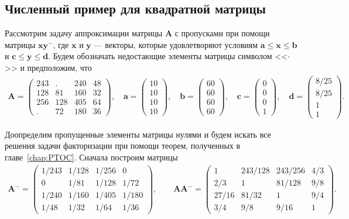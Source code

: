 \documentclass[specialist,
               substylefile = spbu.rtx,
               subf,href,colorlinks=true, 12pt]{disser}
\theoremstyle{definition}
\begin{document}
\subsection{Численный пример для квадратной матрицы}\label{sec:example}
Рассмотрим задачу аппроксимации матрицы $\bm{A}$ с пропусками при помощи матрицы $\bm{x}\bm{y}^{-}$, где  $\bm{x}$ и $\bm{y}$ --- векторы, которые удовлетворяют условиям $\bm{a}\leq \bm{x}\leq \bm{b}$ и $\bm{c}\leq \bm{y}\leq \bm{d}$. Будем обозначать недостающие элементы матрицы символом <<$\cdot$>> и предположим, что
\begin{equation*}
\begin{gathered}
\bm{A}
=
\begin{pmatrix}
243 &. &240 &48\\
128 &81 &160 &32\\
256 &128 &405 &64\\
. &72 &180 &36
\end{pmatrix},
\quad
\bm{a}
=
\begin{pmatrix}
10\\
10\\
10\\
10
\end{pmatrix},
\quad
\bm{b}
=
\begin{pmatrix}
60\\
60\\
60\\
60
\end{pmatrix},
\quad
\bm{c}
=
\begin{pmatrix}
0\\
0\\
0\\
1
\end{pmatrix},
\quad
\bm{d}
=
\begin{pmatrix}
8/25\\
8/25\\
1\\
1
\end{pmatrix}.
\end{gathered}
\end{equation*}

Доопределим пропущенные элементы матрицы нулями и будем искать все решения задачи факторизации при помощи теорем, полученных в главе~\ref{chap:PTOC}. 
Сначала построим матрицы
\begin{gather*}
\bm{A}^{-}
=
\begin{pmatrix}
1/243 &1/128 &1/256 &0\\
0 &1/81 &1/128 &1/72\\
1/240 &1/160 &1/405 &1/180\\
1/48 &1/32 &1/64 &1/36
\end{pmatrix},
\qquad
\bm{A}\bm{A}^{-}
=
\begin{pmatrix}
1 & 243/128 &243/256 &4/3\\
2/3 &1 &81/128 &9/8\\
27/16 &81/32 &1 &9/4\\
3/4 &9/8 &9/16 &1
\end{pmatrix}.
\end{gather*}
\end{document}
